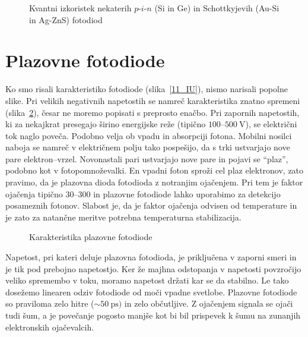 \begin{figure}[h]
\centering
\def\svgwidth{110truemm} 

\caption{Kvantni izkoristek nekaterih $p$-$i$-$n$ (Si in Ge) in Schottkyjevih (Au-Si in Ag-ZnS)
fotodiod}
\label{11_odziv}
\end{figure}

\section{Plazovne fotodiode}
Ko smo risali karakteristiko fotodiode (slika~\ref{11_IU}), 
nismo narisali popolne slike.
Pri velikih negativnih napetostih se namreč karakteristika znatno spremeni (slika~\ref{11_plaz}), 
česar ne moremo popisati s preprosto enačbo. Pri zapornih napetostih, ki za nekajkrat presegajo 
širino energijske reže (tipično $100$--$500~\si{\volt}$), 
se električni tok naglo poveča. Podobno velja ob vpadu in absorpciji fotona. 
Mobilni nosilci naboja se namreč v električnem polju tako pospešijo, da s trki ustvarjajo nove pare 
elektron--vrzel. Novonastali pari  ustvarjajo nove pare in pojavi se ``plaz'', podobno kot v 
fotopomnoževalki. En vpadni foton sproži cel plaz elektronov, zato pravimo, da je plazovna dioda
fotodioda z notranjim ojačenjem. Pri tem je faktor ojačenja tipično $30$--$300$ 
in plazovne fotodiode lahko 
uporabimo za detekcijo posameznih fotonov. Slabost je, da je faktor ojačenja odvisen od
temperature in je zato za natančne meritve potrebna temperaturna stabilizacija.
\begin{figure}[h]
\centering
\def\svgwidth{60truemm} 

\caption{Karakteristika plazovne fotodiode}
\label{11_plaz}
\end{figure}

Napetost, pri kateri deluje plazovna fotodioda, je priključena v zaporni smeri 
in je tik pod prebojno napetostjo. Ker že  majhna odstopanja v napetosti povzročijo veliko
spremembo v toku, moramo napetost držati kar se da stabilno. Le tako dosežemo 
linearen odziv fotodiode od moči vpadne svetlobe. Plazovne fotodiode so praviloma zelo hitre 
($\sim 50~\si{\pico\second})$ in zelo občutljive. Z ojačenjem signala se ojači tudi šum, a je 
povečanje pogosto manjše kot bi bil prispevek k šumu na zunanjih elektronskih ojačevalcih. 

